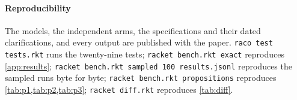 \paragraph{Reproducibility} The models, the independent arms, the specifications and their dated clarifications, and every output are published with the paper. \texttt{raco test tests.rkt} runs the twenty-nine tests; \texttt{racket bench.rkt exact} reproduces \cref{app:results}; \texttt{racket bench.rkt sampled 100 results.jsonl} reproduces the sampled runs byte for byte; \texttt{racket bench.rkt propositions} reproduces \cref{tab:p1,tab:p2,tab:p3}; \texttt{racket diff.rkt} reproduces \cref{tab:diff}.
